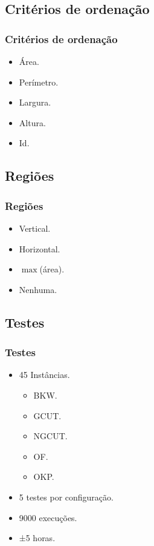 \documentclass[12pt]{beamer}
\begin{document}
    \subsection{Critérios de ordenação}\label{subsec:criterios-de-ordenacao}
    \begin{frame}
        \frametitle{Critérios de ordenação}
        \begin{itemize}
            \item Área.
            \item Perímetro.
            \item Largura.
            \item Altura.
            \item Id.
        \end{itemize}
    \end{frame}

    \subsection{Regiões}\label{subsec:regioes}
    \begin{frame}
        \frametitle{Regiões}
        \begin{itemize}
            \item Vertical.
            \item Horizontal.
            \item $\max$(área).
            \item Nenhuma.
        \end{itemize}
    \end{frame}

    \subsection{Testes}\label{subsec:testes}
    \begin{frame}
        \frametitle{Testes}
        \begin{itemize}
            \item 45 Instâncias.
            \begin{itemize}
                \item BKW\@.
                \item GCUT\@.
                \item NGCUT\@.
                \item OF\@.
                \item OKP\@.
            \end{itemize}
            \item 5 testes por configuração.
            \item 9000 execuções.
            \item ±5 horas.
        \end{itemize}
    \end{frame}
\end{document}
